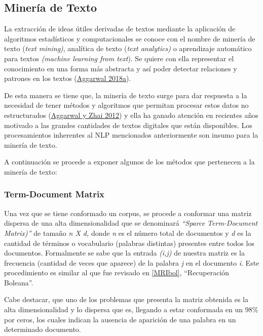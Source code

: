 \documentclass[
  12pt,
  openany]{book}
\begin{document}
\hypertarget{textmin}{%
\subsection{Minería de Texto}\label{textmin}}

La extracción de ideas útiles derivadas de textos mediante la aplicación de algoritmos estadísticos y computacionales se conoce con el nombre de minería de texto (\emph{text mining)}, analítica de texto (\emph{text analytics)} o aprendizaje automático para textos \emph{(machine learning from text}). Se quiere con ella representar el conocimiento en una forma más abstracta y así poder detectar relaciones y patrones en los textos (\protect\hyperlink{ref-aggarwal2018a}{Aggarwal 2018a}).

De esta manera se tiene que, la minería de texto surge para dar respuesta a la necesidad de tener métodos y algoritmos que permitan procesar estos datos no estructurados (\protect\hyperlink{ref-miningt2012}{Aggarwal y Zhai 2012}) y ella ha ganado atención en recientes años motivado a las grandes cantidades de textos digitales que están disponibles. Los procesamientos inherentes al NLP mencionados anteriormente son insumo para la minería de texto.

A continuación se procede a exponer algunos de los métodos que pertenecen a la minería de texto:

\hypertarget{tdm}{%
\subsubsection{Term-Document Matrix}\label{tdm}}

Una vez que se tiene conformado un corpus, se procede a conformar una matriz dispersa de una alta dimensionalidad que se denominará \emph{``Sparce Term-Document Matrix)''} de tamaño \emph{n X d,} donde \emph{n} es el número total de documentos y \emph{d} es la cantidad de términos o vocabulario (palabras distintas) presentes entre todos los documentos. Formalmente se sabe que la entrada \emph{(i,j)} de nuestra matriz es la frecuencia (cantidad de veces que aparece) de la palabra \emph{j} en el documento \emph{i}. Este procedimiento es similar al que fue revisado en \ref{MRIbol}, ``Recuperación Boleana''.

Cabe destacar, que uno de los problemas que presenta la matriz obtenida es la alta dimensionalidad y lo dispersa que es, llegando a estar conformada en un 98\% por ceros, los cuales indican la ausencia de aparición de una palabra en un determinado documento.
\end{document}
